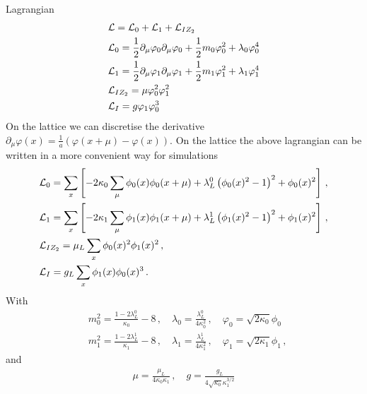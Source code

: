 \documentclass[10pt,a4paper]{article}
\begin{document}
 Lagrangian
 \begin{align}
 & {\cal L}= {\cal L}_0+ {\cal L}_1+  {\cal L}_{IZ_2} \\
 &{\cal L}_0= \frac{1}{2} \partial_\mu \varphi_0\partial_\mu \varphi_0 +\frac{1}{2}m_0 \varphi_0^2 +\lambda_0 \varphi_0^4 \\
 &{\cal L}_1=\frac{1}{2} \partial_\mu \varphi_1\partial_\mu \varphi_1 +\frac{1}{2}m_1 \varphi_1^2+\lambda_1 \varphi_1^4 \\
 &{\cal L}_{IZ_2}= \mu \varphi_0^2 \varphi_1^2 \\
  &{\cal L}_{I}= g \varphi_1 \varphi_0^3
 \end{align}
On the lattice we can discretise the derivative $\partial_\mu \varphi(x)=\frac{1}{a}(\varphi(x+\mu)-\varphi(x)) $.
On the lattice the above lagrangian can be written in a more convenient way for simulations
\begin{align}
 &{\cal L}_0= \sum_{x}\left[ -2\kappa_0\sum_\mu \phi_0(x) \phi_0({x+\mu}) +\lambda_L^0 \left( \phi_0(x)^2-1\right)^2+ \phi_0(x)^2  \right]\,,\\
 &{\cal L}_1= \sum_{x}\left[ -2\kappa_1\sum_\mu \phi_1(x) \phi_1({x+\mu}) +\lambda_L^1 \left( \phi_1(x)^2-1\right)^2+ \phi_1(x)^2  \right]\,,\\
 &{\cal L}_{IZ_2}= \mu_L  \sum_{x} \phi_0(x)^2 \phi_1(x)^2 \,,\\
  &{\cal L}_{I}= g_L \sum_{x} \phi_1(x) \phi_0(x)^3 \,.
 \end{align}
With
\begin{align}
& m_0^2=\frac{1-2\lambda_L^0}{\kappa_0}-8\,,\quad \lambda_0=\frac{\lambda_L^0}{4\kappa_0^2}\,,\quad \varphi_0=\sqrt{2\kappa_0}\phi_0\\
& m_1^2=\frac{1-2\lambda_L^1}{\kappa_1}-8\,,\quad \lambda_1=\frac{\lambda_L^1}{4\kappa_1^2}
\,,\quad \varphi_1=\sqrt{2\kappa_1}\phi_1 \,,
 \end{align}
 and
 \begin{align}
\mu=\frac{\mu_L}{4\kappa_0\kappa_1} \,,\quad g=\frac{g_L}{4\sqrt{\kappa_0}\kappa_1^{3/2}}
 \end{align}
 
 
\end{document}
